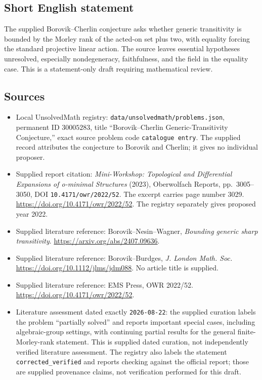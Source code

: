 \documentclass[11pt]{article}
\begin{document}
\subsection{Short English statement}
The supplied Borovik--Cherlin conjecture asks whether generic transitivity is bounded by the Morley rank of the acted-on set plus two, with equality forcing the standard projective linear action. The source leaves essential hypotheses unresolved, especially nondegeneracy, faithfulness, and the field in the equality case. This is a statement-only draft requiring mathematical review.
\subsection{Sources}
\begin{itemize}
\item Local UnsolvedMath registry: \texttt{data/unsolvedmath/problems.json}, permanent ID \(30005283\), title ``Borovik--Cherlin Generic-Transitivity Conjecture,'' exact source problem code \texttt{catalogue entry}. The supplied record attributes the conjecture to Borovik and Cherlin; it gives no individual proposer.
\item Supplied report citation: \emph{Mini-Workshop: Topological and Differential Expansions of o-minimal Structures} (2023), Oberwolfach Reports, pp.~3005--3050, DOI \texttt{10.4171/owr/2022/52}. The excerpt carries page number 3029. \url{https://doi.org/10.4171/owr/2022/52}. The registry separately gives proposed year 2022.
\item Supplied literature reference: Borovik--Nesin--Wagner, \emph{Bounding generic sharp transitivity}. \url{https://arxiv.org/abs/2407.09636}.
\item Supplied literature reference: Borovik--Burdges, \emph{J. London Math. Soc.} \url{https://doi.org/10.1112/jlms/jdm088}. No article title is supplied.
\item Supplied literature reference: EMS Press, OWR 2022/52. \url{https://doi.org/10.4171/owr/2022/52}.
\item Literature assessment dated exactly \texttt{2026-08-22}: the supplied curation labels the problem ``partially solved'' and reports important special cases, including algebraic-group settings, with continuing partial results for the general finite-Morley-rank statement. This is supplied dated curation, not independently verified literature assessment. The registry also labels the statement \texttt{corrected\_verified} and reports checking against the official report; those are supplied provenance claims, not verification performed for this draft.
\end{itemize}
\end{document}

